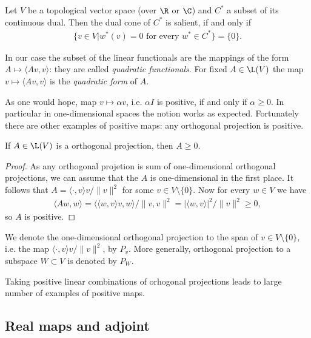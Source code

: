 \begin{lause}\label{positive_proper}
	Let $V$ be a topological vector space (over $\R$ or $\C$) and $C^{*}$ a subset of its continuous dual. Then
	the dual cone of $C^{*}$ is salient, if and only if
	\begin{align*}
		\{v \in V | w^{*}(v) = 0 \text{ for every $w^{*} \in C^{*}$} \} = \{0\}.
	\end{align*}
\end{lause}

In our case the subset of the linear functionals are the mappings of the form $A \mapsto \langle A v, v \rangle$: they are called \textit{quadratic functionals}. For fixed $A \in \L(V)$ the map $v \mapsto \langle A v, v \rangle$ is the \textit{quadratic form} of $A$.

As one would hope, map $v \mapsto \alpha v$, i.e. $\alpha I$ is positive, if and only if $\alpha \geq 0$. In particular in one-dimensional spaces the notion works as expected. Fortunately there are other examples of positive maps: any orthogonal projection is positive.

\begin{prop}
	If $A \in \L(V)$ is a orthogonal projection, then $A \geq 0$.
\end{prop}
\begin{proof}
	As any orthogonal projetion is sum of one-dimensional orthogonal projections, we can assume that the $A$ is one-dimensional in the first place. It follows that $A = \langle \cdot, v \rangle v/\|v\|^2$ for some $v \in V \setminus \{0\}$. Now for every $w \in V$ we have
	\begin{align*}
		\langle A w, w \rangle = \langle \langle w, v \rangle v, w \rangle/\|v, v\|^{2} = |\langle w, v \rangle|^{2}/\|v\|^{2} \geq 0,
	\end{align*}
	so $A$ is positive.
\end{proof}

We denote the one-dimensional orthogonal projection to the span of $v \in V \setminus \{0\}$, i.e. the map $ \langle \cdot, v \rangle v/\|v\|^2$, by $P_{v}$. More generally, orthogonal projection to a subspace $W \subset V$ is denoted by $P_{W}$.

Taking positive linear combinations of orhogonal projections leads to large number of examples of positive maps.

\subsection{Real maps and adjoint}

